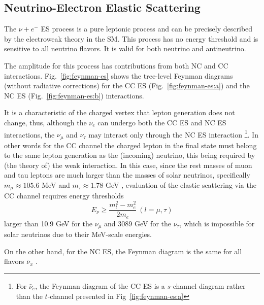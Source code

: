 \subsection{Neutrino-Electron Elastic Scattering}\label{sect:NuEStheory}
The $\nu+e^-$ ES process is a pure leptonic process and can be precisely described by the electroweak theory in the SM. This process has no energy threshold and is sensitive to all neutrino flavors. It is valid for both neutrino and antineutrino.

The amplitude for this process has contributions from both NC and CC interactions. Fig.~\ref{fig:feynman-es} shows the tree-level Feynman diagrams (without radiative corrections) for the CC ES (Fig.~\ref{fig:feynman-es:a}) and the NC ES (Fig.~\ref{fig:feynman-es:b}) interactions. 

It is a characteristic of the charged vertex that lepton generation does not change, thus, although the $\nu_e$ can undergo both the CC ES and NC ES interactions, the $\nu_{\mu}$ and $\nu_\tau$ may interact only through the NC ES interaction \footnote{For $\bar{\nu}_e$, the Feynman diagram of the CC ES is a $s$-channel diagram rather than the $t$-channel presented in Fig~\ref{fig:feynman-es:a}}. In other words for the CC channel the charged lepton in the final state must belong to the same lepton generation as the (incoming) neutrino, this being required by (the theory of) the weak interaction. In this case, since the rest masses of muon and tau leptons are much larger than the masses of solar neutrinos, specifically $m_\mu\approx 105.6$ MeV and $m_\tau\approx 1.78$ GeV \cite{pdg2020}, evaluation of the elastic scattering via the CC channel requires energy thresholds \cite{mcfarland2008neutrino}
\begin{equation*}
E_{\nu}\geq \frac{m^2_l-m_e^2}{2m_e}~(l=\mu,\tau)
\end{equation*}
larger than 10.9 GeV for the $\nu_\mu$ and 3089 GeV for the $\nu_\tau$, which is impossible for solar neutrinos due to their MeV-scale energies.

On the other hand, for the NC ES, the Feynman diagram is the same for all flavors $\bar{\nu}_x$ \cite{giunti2007fundamentals,xing2011neutrinos}. 

